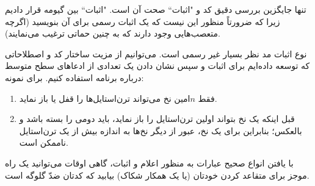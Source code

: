 \documentclass{book}
\newcommand{\clearemptydoublepage}{\newpage\cleardoublepage}
\begin{document}
    تنها جایگزین بررسی دقیق کد و "اثبات`` صحت آن است. "اثبات`` بین گیومه قرار دادیم زیرا که ضرورتاً منظور این نیست که یک اثبات 
    رسمی برای آن بنویسید (اگرچه متعصب‌هایی وجود دارند که به چنین حماتی  ترغیب می‌نمایند).

نوع اثبات مد نظر بسیار غیر رسمی است. می‌توانیم از مزیت ساختار کد و اصطلاحاتی که توسعه داده‌ایم برای اثبات و سپس نشان دادن 
یک تعدادی از ادعاهای سطح متوسط درباره برنامه استفاده کنیم. برای نمونه:


    
\begin{enumerate}

\item 
    فقط $n$امین نخ می‌تواند ترن‌استایل‌ها را قفل یا باز نماید. 

\item 
    قبل اینکه یک نخ بتواند اولین ترن‌استایل را باز نماید، باید دومی را بسته باشد و بالعکس؛‌ بنابراین برای یک نخ، عبور از دیگر نخ‌ها به اندازه بیش از 
    یک تر‌ن‌استایل ناممکن است. 

\end{enumerate}

    با یافتن انواع صحیح عبارات به منظور اعلام و اثبات، گاهی اوقات می‌توانید یک راه موجز برای متقاعد کردن خودتان  (یا یک همکار 
    شکاک) بیابید که کدتان ضدّ  گلوگه است. 
    

\clearemptydoublepage
\end{document}
